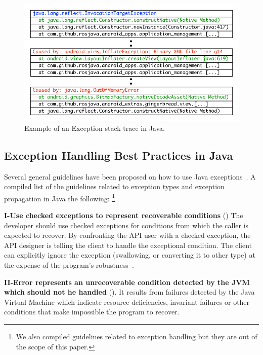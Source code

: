 \documentclass[conference]{IEEEtran}
\begin{document}
\begin{figure} \centering \includegraphics[scale=0.6]{wrappings}
\caption{Example of an Exception stack trace in Java.}
\label{fig:wrapping}
\end{figure}

\subsection{Exception Handling Best Practices in Java}
\label{sec:best}

Several general guidelines have been proposed on how to use Java
exceptions~\cite{mandrioli1992advances,gosling2000java,wirfs2006toward,
bloch2008effective}. 
A compiled list of the guidelines related to exception types and exception
propagation in Java the following: \footnote{We also compiled guidelines related
to exception handling but they are out of the scope of this paper.}


\textbf{I-Use checked exceptions to represent recoverable
conditions} (\cite{mandrioli1992advances,gosling2000java,wirfs2006toward,bloch2008effective})
The developer should use checked exceptions for conditions from which the caller
is expected to recover. By confronting the API user with a checked exception,
the API designer is telling the client to handle the exceptional condition. The
client can explicitly ignore the exception (swallowing, or converting it to
other type) at the expense of the program's robustness~\cite{gosling2000java}.

\textbf{II-Error represents an unrecoverable condition detected by the JVM which
should not he handled} (\cite{gosling2000java}). It results from failures detected
by the Java Virtual Machine which indicate resource deficiencies, invariant
failures or other conditions that make impossible the program to recover.
\end{document}
